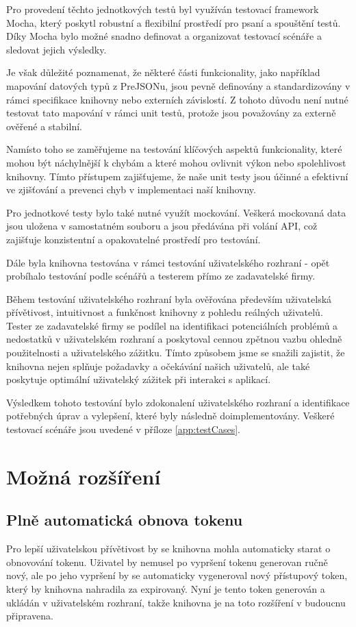 \documentclass[czech, bc, kiv, he, iso690numb]{fasthesis}
\begin{document}
Pro provedení těchto jednotkových testů byl využíván testovací framework Mocha, který poskytl robustní a flexibilní prostředí pro psaní a spouštění testů. 
Díky Mocha bylo možné snadno definovat a organizovat testovací scénáře a sledovat jejich výsledky.

Je však důležité poznamenat, že některé části funkcionality, jako například mapování datových typů z PreJSONu, jsou pevně definovány a standardizovány v rámci specifikace knihovny nebo externích závislostí. 
Z tohoto důvodu není nutné testovat tato mapování v rámci unit testů, protože jsou považovány za externě ověřené a stabilní.

Namísto toho se zaměřujeme na testování klíčových aspektů funkcionality, které mohou být náchylnější k chybám a které mohou ovlivnit výkon nebo spolehlivost knihovny. 
Tímto přístupem zajišťujeme, že naše unit testy jsou účinné a efektivní ve zjišťování a prevenci chyb v implementaci naší knihovny.

Pro jednotkové testy bylo také nutné využít mockování. Veškerá mockovaná data jsou uložena v samostatném souboru a jsou předávána při volání API, 
což zajišťuje konzistentní a opakovatelné prostředí pro testování.

Dále byla knihovna testována v rámci testování uživatelského rozhraní - opět probíhalo testování podle scénářů a testerem přímo ze zadavatelské firmy.

Během testování uživatelského rozhraní byla ověřována především uživatelská přívětivost, intuitivnost a funkčnost knihovny z pohledu reálných uživatelů. 
Tester ze zadavatelské firmy se podílel na identifikaci potenciálních problémů a nedostatků v uživatelském rozhraní a poskytoval cennou zpětnou vazbu ohledně použitelnosti a uživatelského zážitku.
Tímto způsobem jsme se snažili zajistit, že knihovna nejen splňuje požadavky a očekávání našich uživatelů, ale také poskytuje optimální uživatelský zážitek při interakci s aplikací.

Výsledkem tohoto testování bylo zdokonalení uživatelského rozhraní a identifikace potřebných úprav a vylepšení, které byly následně doimplementovány. Veškeré testovací scénáře
jsou uvedené v příloze \ref{app:testCases}.

\section{Možná rozšíření}
\subsection{Plně automatická obnova tokenu}
Pro lepší uživatelskou přívětivost by se knihovna mohla automaticky starat o obnovování tokenu. Uživatel by nemusel po vypršení tokenu generovan ručně nový, ale
po jeho vypršení by se automaticky vygeneroval nový přístupový token, který by knihovna nahradila za expirovaný.
Nyní je tento token generován a ukládán v uživatelském rozhraní, takže knihovna je na toto rozšíření v budoucnu připravena.
\end{document}
